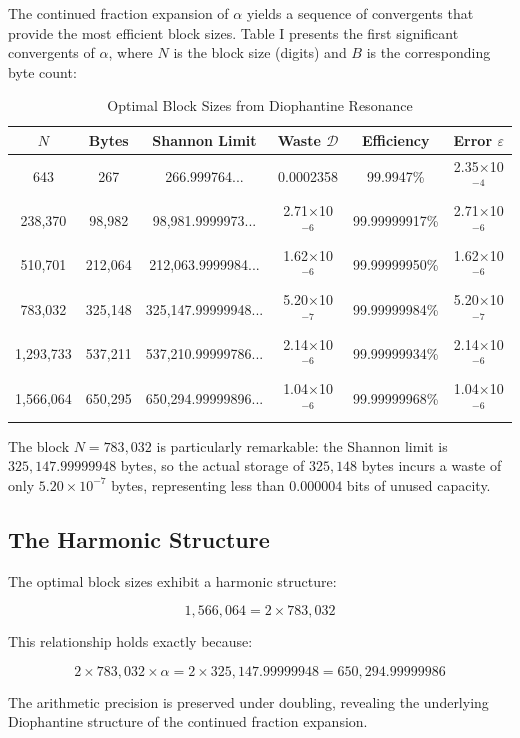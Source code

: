 \documentclass[10pt, onecolumn]{IEEEtran}
\begin{document}
The continued fraction expansion of $\alpha$ yields a sequence of convergents that provide the most efficient block sizes. Table I presents the first significant convergents of $\alpha$, where $N$ is the block size (digits) and $B$ is the corresponding byte count:

\begin{table}[ht]
\centering
\caption{Optimal Block Sizes from Diophantine Resonance}
\label{tab:optimal_blocks}
\begin{tabular}{cccccc}
\toprule
$N$ & Bytes & Shannon Limit & Waste $\mathcal{D}$ & Efficiency & Error $\varepsilon$ \\
\midrule
643 & 267 & 266.999764... & 0.0002358 & 99.9947\% & 2.35$\times$10$^{-4}$ \\
238,370 & 98,982 & 98,981.9999973... & 2.71$\times$10$^{-6}$ & 99.99999917\% & 2.71$\times$10$^{-6}$ \\
510,701 & 212,064 & 212,063.9999984... & 1.62$\times$10$^{-6}$ & 99.99999950\% & 1.62$\times$10$^{-6}$ \\
783,032 & 325,148 & 325,147.99999948... & 5.20$\times$10$^{-7}$ & 99.99999984\% & 5.20$\times$10$^{-7}$ \\
1,293,733 & 537,211 & 537,210.99999786... & 2.14$\times$10$^{-6}$ & 99.99999934\% & 2.14$\times$10$^{-6}$ \\
1,566,064 & 650,295 & 650,294.99999896... & 1.04$\times$10$^{-6}$ & 99.99999968\% & 1.04$\times$10$^{-6}$ \\
\bottomrule
\end{tabular}
\end{table}

The block $N=783,032$ is particularly remarkable: the Shannon limit is $325,147.99999948$ bytes, so the actual storage of $325,148$ bytes incurs a waste of only $5.20\times10^{-7}$ bytes, representing less than $0.000004$ bits of unused capacity.

\subsection{The Harmonic Structure}

The optimal block sizes exhibit a harmonic structure:

\[
1,566,064 = 2 \times 783,032
\]

This relationship holds exactly because:

\[
2 \times 783,032 \times \alpha = 2 \times 325,147.99999948 = 650,294.99999986
\]

The arithmetic precision is preserved under doubling, revealing the underlying Diophantine structure of the continued fraction expansion.
\end{document}
